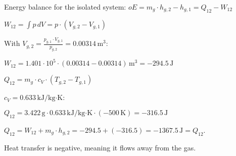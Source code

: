 Energy balance for the isolated system:  
\( oE = m_g \cdot h_{g,2} - h_{g,1} = Q_{12} - W_{12} \)  

\( W_{12} = \int p \, dV = p \cdot (V_{g,2} - V_{g,1}) \)  

With \( V_{g,2} = \frac{p_{g,1} \cdot V_{g,1}}{p_{g,2}} = 0.00314 \, \text{m}^3 \):  

\( W_{12} = 1.401 \cdot 10^5 \cdot (0.00314 - 0.00314) \, \text{m}^3 = -294.5 \, \text{J} \)  

\( Q_{12} = m_g \cdot c_V \cdot (T_{g,2} - T_{g,1}) \)  

\( c_V = 0.633 \, \text{kJ/kg·K} \):  

\( Q_{12} = 3.422 \, \text{g} \cdot 0.633 \, \text{kJ/kg·K} \cdot (-500 \, \text{K}) = -316.5 \, \text{J} \)  

\( Q_{12} = W_{12} + m_g \cdot h_{g,2} = -294.5 + (-316.5) = -1367.5 \, \text{J} = Q_{12} \).  

Heat transfer is negative, meaning it flows away from the gas.